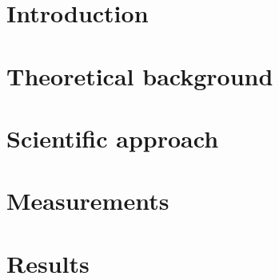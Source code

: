 \documentclass[conference]{IEEEtran}
\begin{document}
\section{Introduction}



\section{Theoretical background}







\section{Scientific approach}



\section{Measurements}









\section{Results} \label{sec_results}
\end{document}
